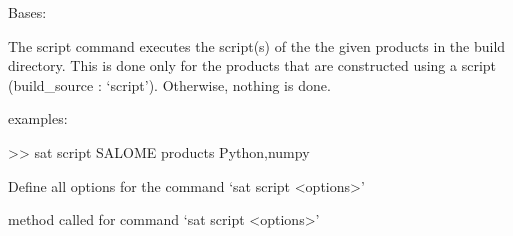 \documentclass[a4paper,10pt,english]{sphinxmanual}
\begin{document}
\begin{fulllineitems}
\label{\detokenize{apidoc_commands/commands:commands.script.Command}}
Bases: 

The script command executes the script(s) of the the given products in the build directory.
This is done only for the products that are constructed using a script (build\_source : ‘script’).
Otherwise, nothing is done.

\begin{DUlineblock}{0em}
\item[] examples:
\item[]
\begin{DUlineblock}{\DUlineblockindent}
\item[] \textgreater{}\textgreater{} sat script SALOME \textendash{}products Python,numpy
\end{DUlineblock}
\end{DUlineblock}

\begin{fulllineitems}
\label{\detokenize{apidoc_commands/commands:commands.script.Command.getParser}}
Define all options for the command ‘sat script \textless{}options\textgreater{}’

\end{fulllineitems}


\begin{fulllineitems}
\label{\detokenize{apidoc_commands/commands:commands.script.Command.name}}
\end{fulllineitems}


\begin{fulllineitems}
\label{\detokenize{apidoc_commands/commands:commands.script.Command.run}}
method called for command ‘sat script \textless{}options\textgreater{}’

\end{fulllineitems}


\end{fulllineitems}
\end{document}

